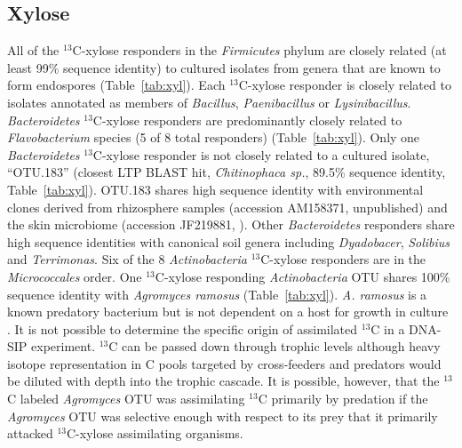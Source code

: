 \documentclass{article}
\newcommand{\beginsupplement}{%
\setcounter{table}{0} \renewcommand{\thetable}{S\arabic{table}}%
\setcounter{figure}{0} \renewcommand{\thefigure}{S\arabic{figure}}%
}
\begin{document}
\subsection{Xylose}
All of the $^{13}$C-xylose responders in the \textit{Firmicutes} phylum are
closely related (at least 99\% sequence identity) to cultured isolates from
genera that are known to form endospores (Table~\ref{tab:xyl}). Each
$^{13}$C-xylose responder is closely related to isolates annotated as members
of \textit{Bacillus}, \textit{Paenibacillus} or \textit{Lysinibacillus}.
\textit{Bacteroidetes} $^{13}$C-xylose responders are predominantly closely
related to \textit{Flavobacterium} species (5 of 8 total responders)
(Table~\ref{tab:xyl}).  Only one \textit{Bacteroidetes} $^{13}$C-xylose
responder is not closely related to a cultured isolate, ``OTU.183'' (closest
LTP BLAST hit, \textit{Chitinophaca sp.}, 89.5\% sequence identity,
Table~\ref{tab:xyl}). OTU.183 shares high sequence identity with environmental
clones derived from rhizosphere samples (accession AM158371, unpublished) and
the skin microbiome (accession JF219881, \citep{Kong_2012}). Other
\textit{Bacteroidetes} responders share high sequence identities with canonical
soil genera including \textit{Dyadobacer}, \textit{Solibius} and
\textit{Terrimonas}. Six of the 8 \textit{Actinobacteria} $^{13}$C-xylose
responders are in the \textit{Micrococcales} order. One $^{13}$C-xylose
responding \textit{Actinobacteria} OTU shares 100\% sequence identity with
\textit{Agromyces ramosus} (Table~\ref{tab:xyl}).  \textit{A. ramosus} is a
known predatory bacterium but is not dependent on a host for growth in culture
\citep{16346402}. It is not possible to determine the specific origin of
assimilated $^{13}$C in a DNA-SIP experiment. $^{13}$C can be passed down
through trophic levels although heavy isotope representation in C pools
targeted by cross-feeders and predators would be diluted with depth into the
trophic cascade. It is possible, however, that the $^{13}$C labeled
\textit{Agromyces} OTU was assimilating $^{13}$C primarily by predation if the
\textit{Agromyces} OTU was selective enough with respect to its prey that it
primarily attacked $^{13}$C-xylose assimilating organisms. 

\beginsupplement




\end{document}

